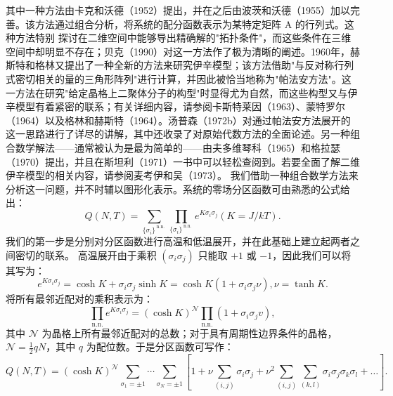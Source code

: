 其中一种方法由卡克和沃德（1952）提出，并在之后由波茨和沃德（1955）加以完善。该方法通过组合分析，将系统的配分函数表示为某特定矩阵 A 的行列式。这种方法特别
探讨在二维空间中能够导出精确解的"拓扑条件"，而这些条件在三维空间中却明显不存在；贝克（1990）对这一方法作了极为清晰的阐述。1960年，赫斯特和格林又提出了一种全新的方法来研究伊辛模型；该方法借助"与反对称行列式密切相关的量的三角形阵列"进行计算，并因此被恰当地称为"帕法安方法"。这一方法在研究"给定晶格上二聚体分子的构型"时显得尤为自然，而这些构型又与伊辛模型有着紧密的联系；有关详细内容，请参阅卡斯特莱因（1963）、蒙特罗尔（1964）以及格林和赫斯特（1964）。汤普森（1972b）对通过帕法安方法展开的这一思路进行了详尽的讲解，其中还收录了对原始代数方法的全面论述。另一种组合数学解法——通常被认为是最为简单的——由夫多维琴科（1965）和格拉瑟（1970）提出，并且在斯坦利（1971）一书中可以轻松查阅到。若要全面了解二维伊辛模型的相关内容，请参阅麦考伊和吴（1973）。
我们借助一种组合数学方法来分析这一问题，并不时辅以图形化表示。系统的零场分区函数可由熟悉的公式给出：
\begin{equation}\tag{13.1.83}\label{eq:13.1.83}
Q ( N , T ) = \sum _ { \{ \sigma _ { i } \} ^{\mathrm { ~ n . n . ~} } } \prod _ { \{ \sigma _ { i } \} ^{\mathrm { ~ n . n . ~} } } e ^{K \sigma _ { i} \sigma _ { j } }  ( K = J / k T ) .
\end{equation}
我们的第一步是分别对分区函数进行高温和低温展开，并在此基础上建立起两者之间密切的联系。
高温展开由于乘积 \((\sigma_{i}\sigma_{j})\) 只能取 \(+1\) 或 \(-1\)，因此我们可以将其写为：
\begin{equation}\tag{13.1.84}\label{eq:13.1.84}
e ^{K \sigma _ { i} \sigma _ { j } } = \cosh K + \sigma _ { i } \sigma _ { j } \sinh K = \cosh K ( 1 + \sigma _ { i } \sigma _ { j } \nu ) ,  \nu = \operatorname { t a n h } K .
\end{equation}
将所有最邻近配对的乘积表示为：
\begin{equation}\tag{13.1.85}\label{eq:13.1.85}
\prod _ { \mathrm { n . n . } } e ^{K \sigma _ { i} \sigma _ { j } } = ( \cosh K ) ^{\mathcal { N} } \prod _ { \mathrm { n . n . } } ( 1 + \sigma _ { i } \sigma _ { j } v ) ,
\end{equation}
其中 \(\mathcal{N}\) 为晶格上所有最邻近配对的总数；对于具有周期性边界条件的晶格，\(\mathcal{N}=\frac{1}{2}qN\)，其中 \(q\) 为配位数。于是分区函数可写作：
\begin{equation}\tag{13.1.86}\label{eq:13.1.86}
Q ( N , T ) = ( \cosh K ) ^{\mathcal { N} } \sum _ { \sigma _ { 1 } = \pm 1 } \cdots \sum _ { \sigma _ { N } = \pm 1 } \left[ 1 + \nu \sum _ { ( i , j ) } \sigma _ { i } \sigma _ { j } + \nu ^{2} \sum _ { ( i , j ) } \sum _ { ( k , l ) } \sigma _ { i } \sigma _ { j } \sigma _ { k } \sigma _ { l } + \ldots \right] .
\end{equation}
